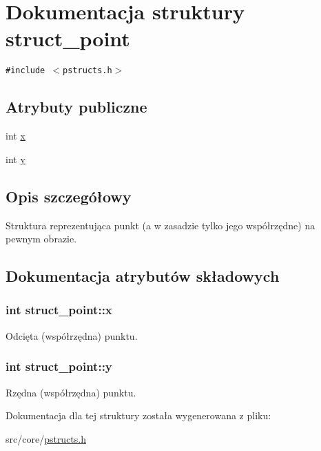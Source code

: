 \hypertarget{structstruct__point}{
\section{Dokumentacja struktury struct\_\-point}
\label{structstruct__point}
}
{\tt \#include $<$pstructs.h$>$}

\subsection*{Atrybuty publiczne}
\begin{CompactItemize}
\item 
int \hyperlink{structstruct__point_65c2024766f7e23b9bde4de90011f0be}{x}
\item 
int \hyperlink{structstruct__point_7d32a20acc9bfaf5b7872934a5b0b6d5}{y}
\end{CompactItemize}


\subsection{Opis szczegółowy}
Struktura reprezentująca punkt (a w zasadzie tylko jego współrzędne) na pewnym obrazie. 

\subsection{Dokumentacja atrybutów składowych}
\hypertarget{structstruct__point_65c2024766f7e23b9bde4de90011f0be}{
\subsubsection[{x}]{\setlength{\rightskip}{0pt plus 5cm}int {\bf struct\_\-point::x}}}
\label{structstruct__point_65c2024766f7e23b9bde4de90011f0be}


Odcięta (współrzędna) punktu. \hypertarget{structstruct__point_7d32a20acc9bfaf5b7872934a5b0b6d5}{
\subsubsection[{y}]{\setlength{\rightskip}{0pt plus 5cm}int {\bf struct\_\-point::y}}}
\label{structstruct__point_7d32a20acc9bfaf5b7872934a5b0b6d5}


Rzędna (współrzędna) punktu. 

Dokumentacja dla tej struktury została wygenerowana z pliku:\begin{CompactItemize}
\item 
src/core/\hyperlink{pstructs_8h}{pstructs.h}\end{CompactItemize}
